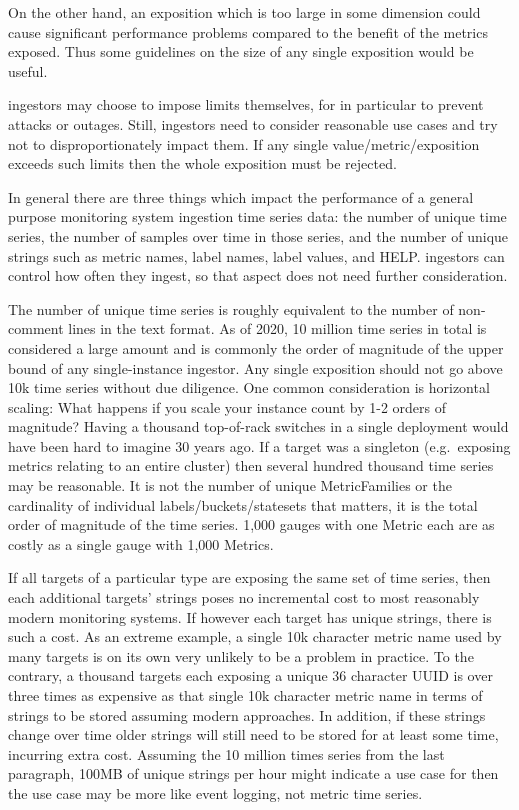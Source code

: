 \documentclass[a4paper,12pt,notitlepage,twoside,openright]{article}
\begin{document}
On the other hand, an exposition which is too large in some dimension
could cause significant performance problems compared to the benefit of
the metrics exposed. Thus some guidelines on the size of any single
exposition would be useful.

ingestors may choose to impose limits themselves, for in particular to
prevent attacks or outages. Still, ingestors need to consider reasonable
use cases and try not to disproportionately impact them. If any single
value/metric/exposition exceeds such limits then the whole exposition
must be rejected.

In general there are three things which impact the performance of a
general purpose monitoring system ingestion time series data: the number
of unique time series, the number of samples over time in those series,
and the number of unique strings such as metric names, label names,
label values, and HELP. ingestors can control how often they ingest, so
that aspect does not need further consideration.

The number of unique time series is roughly equivalent to the number of
non-comment lines in the text format. As of 2020, 10 million time series
in total is considered a large amount and is commonly the order of
magnitude of the upper bound of any single-instance ingestor. Any single
exposition should not go above 10k time series without due diligence.
One common consideration is horizontal scaling: What happens if you
scale your instance count by 1-2 orders of magnitude? Having a thousand
top-of-rack switches in a single deployment would have been hard to
imagine 30 years ago. If a target was a singleton (e.g.~exposing metrics
relating to an entire cluster) then several hundred thousand time series
may be reasonable. It is not the number of unique MetricFamilies or the
cardinality of individual labels/buckets/statesets that matters, it is
the total order of magnitude of the time series. 1,000 gauges with one
Metric each are as costly as a single gauge with 1,000 Metrics.

If all targets of a particular type are exposing the same set of time
series, then each additional targets' strings poses no incremental cost
to most reasonably modern monitoring systems. If however each target has
unique strings, there is such a cost. As an extreme example, a single
10k character metric name used by many targets is on its own very
unlikely to be a problem in practice. To the contrary, a thousand
targets each exposing a unique 36 character UUID is over three times as
expensive as that single 10k character metric name in terms of strings
to be stored assuming modern approaches. In addition, if these strings
change over time older strings will still need to be stored for at least
some time, incurring extra cost. Assuming the 10 million times series
from the last paragraph, 100MB of unique strings per hour might indicate
a use case for then the use case may be more like event logging, not
metric time series.
\end{document}
